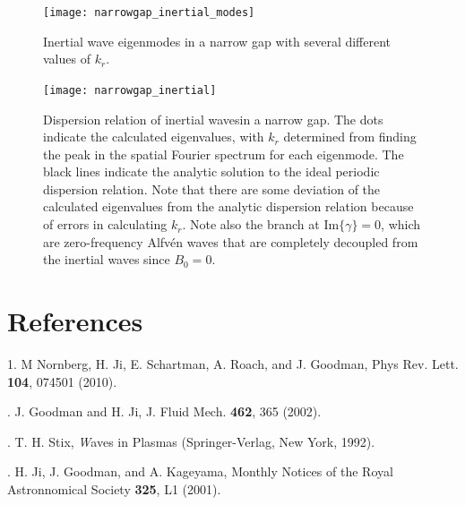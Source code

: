 \documentclass[letterpaper]{article}
\begin{document}
\begin{figure}
\centering
\texttt{[image: narrowgap\_inertial\_modes]}
\caption[Inertial wave eigenmodes in a narrow gap]{Inertial wave
  eigenmodes in a narrow gap with several different values of
  $k_r$.}
\label{fig:globalcode:narrowgap_inertial_modes}
\end{figure}


\begin{figure}
\centering
\texttt{[image: narrowgap\_inertial]}
\caption[Dispersion relation of inertial wavesgap]{Dispersion relation
  of inertial wavesin a narrow gap. The dots indicate the calculated
  eigenvalues, with $k_r$ determined from finding the peak in the
  spatial Fourier spectrum for each eigenmode. The black lines
  indicate the analytic solution to the ideal periodic dispersion
  relation. Note that there are some deviation of the calculated
  eigenvalues from the analytic dispersion relation because of errors
  in calculating $k_r$. Note also the branch at
  $\mathrm{Im}\{\gamma\}=0$, which are zero-frequency Alfv\'en waves
  that are completely decoupled from the inertial waves since
  $B_0=0$.}
\label{fig:globalcode:narrowgap_inertial}
\end{figure}



\section{References}
1. M Nornberg, H. Ji, E. Schartman, A. Roach, and J. Goodman, Phys
Rev. Lett. {\bf 104}, 074501 (2010).

. J. Goodman and H. Ji, J. Fluid Mech. {\bf 462}, 365 (2002).

. T. H. Stix, {\emph Waves in Plasmas} (Springer-Verlag,
New York, 1992).

. H. Ji, J. Goodman, and A. Kageyama, Monthly Notices of the Royal Astronnomical Society {\bf 325}, L1 (2001).
\end{document}
